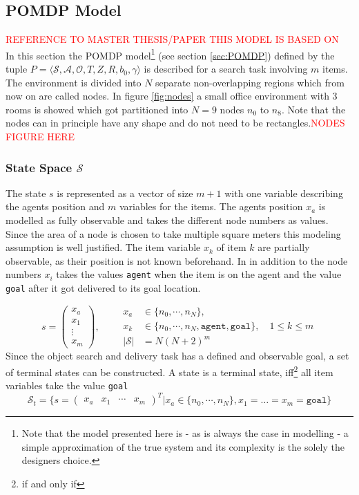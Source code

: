 \subsection{POMDP Model}
\textcolor{red}{REFERENCE TO MASTER THESIS/PAPER THIS MODEL IS BASED ON}\\
In this section the POMDP model\footnote{Note that the model presented here is - as is always the case in modelling - a simple approximation of the true system and its complexity is the solely the designers choice.} (see section \ref{sec:POMDP}) defined by the tuple $P = \langle \mathcal{S}, \mathcal{A}, \mathcal{O}, T, Z, R, b_0, \gamma \rangle$ is described for a search task involving $m$ items. The environment is divided into $N$ separate non-overlapping regions which from now on are called nodes. In figure \ref{fig:nodes} a small office environment with 3 rooms is showed which got partitioned into $N=9$ nodes $n_0$ to $n_8$. Note that the nodes can in principle have any shape and do not need to be rectangles.\textcolor{red}{NODES FIGURE HERE}\\
\subsubsection{State Space $\mathcal{S}$}
The state $s$ is represented as a vector of size $m+1$ with one variable describing the agents position and $m$ variables for the items. The agents position $x_a$ is modelled as fully observable and takes the different node numbers as values. Since the area of a node is chosen to take multiple square meters this modeling assumption is well justified. The item variable $x_k$ of item $k$ are partially observable, as their position is not known beforehand. In in addition to the node numbers $x_i$ takes the values \texttt{agent} when the item is on the agent and the value \texttt{goal} after it got delivered to its goal location.

\begin{equation}
    s=\begin{pmatrix} x_a \\ x_1 \\ \vdots \\ x_m \end{pmatrix}, \qquad \begin{aligned} x_a&\in\{n_0, \cdots, n_N\},\\ 
    x_k &\in \{n_0, \cdots, n_N, \texttt{agent}, \texttt{goal}\}, \quad 1 \leq k \leq m \\
    |\mathcal{S}| &= N(N+2)^m \end{aligned}
\end{equation}
Since the object search and delivery task has a defined and observable goal, a set of terminal states can be constructed. A state is a terminal state, iff\footnote{if and only if} all item variables take the value \texttt{goal}
\begin{equation}\label{eq:s_t}
    \mathcal{S}_t = \{s=\begin{pmatrix} x_a & x_1 & \cdots & x_m \end{pmatrix}^T | x_a\in \{n_0, \cdots, n_N\}, x_1=\ldots=x_m=\texttt{goal}\}
\end{equation}
